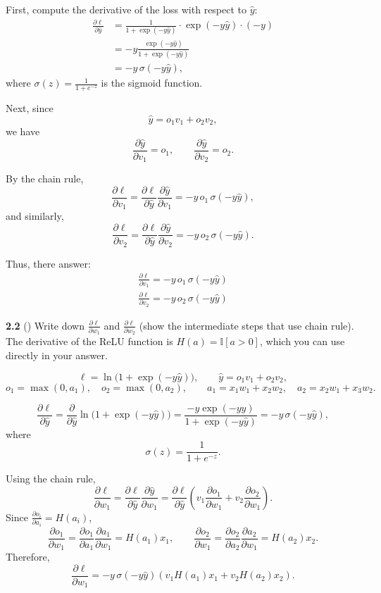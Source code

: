 First, compute the derivative of the loss with respect to $\hat y$:
\begin{align*}
\frac{\partial \ell}{\partial \hat y}
&= \frac{1}{1+\exp(-y\hat y)} \cdot \exp(-y\hat y)\cdot (-y) \\
&= -y \frac{\exp(-y\hat y)}{1+\exp(-y\hat y)} \\
&= -y\,\sigma(-y\hat y),
\end{align*}
where $\sigma(z)=\frac{1}{1+e^{-z}}$ is the sigmoid function.

Next, since
\[
\hat y = o_1v_1 + o_2v_2,
\]
we have
\[
\frac{\partial \hat y}{\partial v_1} = o_1,
\qquad
\frac{\partial \hat y}{\partial v_2} = o_2.
\]

By the chain rule,
\[
\frac{\partial \ell}{\partial v_1}
=
\frac{\partial \ell}{\partial \hat y}\frac{\partial \hat y}{\partial v_1}
=
-y\,o_1\,\sigma(-y\hat y),
\]
and similarly,
\[
\frac{\partial \ell}{\partial v_2}
=
\frac{\partial \ell}{\partial \hat y}\frac{\partial \hat y}{\partial v_2}
=
-y\,o_2\,\sigma(-y\hat y).
\]

Thus, there answer:
\begin{align*}
\frac{\partial \ell}{\partial v_1} = -y\,o_1\,\sigma(-y\hat y)\\
\frac{\partial \ell}{\partial v_2} = -y\,o_2\,\sigma(-y\hat y)
\end{align*}

\bigskip


\textbf{2.2} ()
Write down $\frac{\partial \ell}{\partial w_1}$ and $\frac{\partial \ell}{\partial w_2}$ (show the intermediate steps that use chain rule).
The derivative of the ReLU function is $H(a) = \mathbb{I}[a > 0]$, which you can use directly in your answer.\\


\[
\ell=\ln\bigl(1+\exp(-y\hat y)\bigr),\qquad
\hat y=o_1v_1+o_2v_2,
\]
\[
o_1=\max(0,a_1),\quad o_2=\max(0,a_2),\qquad
a_1=x_1w_1+x_2w_2,\quad a_2=x_2w_1+x_3w_2.
\]

\[
\frac{\partial \ell}{\partial \hat y}
=
\frac{\partial}{\partial \hat y}\ln\bigl(1+\exp(-y\hat y)\bigr)
=
\frac{-y\exp(-y\hat y)}{1+\exp(-y\hat y)}
=
-y\,\sigma(-y\hat y),
\]
where
\[
\sigma(z)=\frac{1}{1+e^{-z}}.
\]

Using the chain rule,
\[
\frac{\partial \ell}{\partial w_1}
=
\frac{\partial \ell}{\partial \hat y}\frac{\partial \hat y}{\partial w_1}
=
\frac{\partial \ell}{\partial \hat y}
\left(
v_1\frac{\partial o_1}{\partial w_1}
+
v_2\frac{\partial o_2}{\partial w_1}
\right).
\]
Since \(\frac{\partial o_i}{\partial a_i}=H(a_i)\),
\[
\frac{\partial o_1}{\partial w_1}
=
\frac{\partial o_1}{\partial a_1}\frac{\partial a_1}{\partial w_1}
=
H(a_1)x_1,
\qquad
\frac{\partial o_2}{\partial w_1}
=
\frac{\partial o_2}{\partial a_2}\frac{\partial a_2}{\partial w_1}
=
H(a_2)x_2.
\]
Therefore,
\[
\frac{\partial \ell}{\partial w_1}
=
-y\,\sigma(-y\hat y)\left(v_1H(a_1)x_1+v_2H(a_2)x_2\right).
\]

